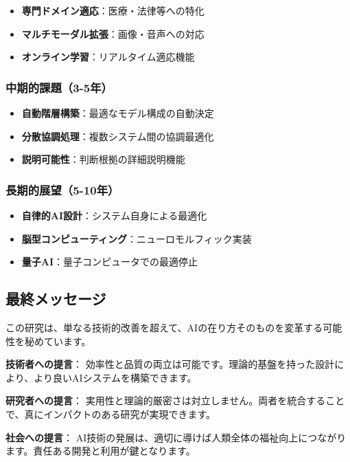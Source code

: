 \documentclass[a4paper,12pt]{jsarticle}
\begin{document}
\begin{itemize}
\item \textbf{専門ドメイン適応}：医療・法律等への特化
\item \textbf{マルチモーダル拡張}：画像・音声への対応
\item \textbf{オンライン学習}：リアルタイム適応機能
\end{itemize}

\subsubsection{中期的課題（3-5年）}

\begin{itemize}
\item \textbf{自動階層構築}：最適なモデル構成の自動決定
\item \textbf{分散協調処理}：複数システム間の協調最適化
\item \textbf{説明可能性}：判断根拠の詳細説明機能
\end{itemize}

\subsubsection{長期的展望（5-10年）}

\begin{itemize}
\item \textbf{自律的AI設計}：システム自身による最適化
\item \textbf{脳型コンピューティング}：ニューロモルフィック実装
\item \textbf{量子AI}：量子コンピュータでの最適停止
\end{itemize}

\subsection{最終メッセージ}

この研究は、単なる技術的改善を超えて、AIの在り方そのものを変革する可能性を秘めています。

\textbf{技術者への提言}：
効率性と品質の両立は可能です。理論的基盤を持った設計により、より良いAIシステムを構築できます。

\textbf{研究者への提言}：
実用性と理論的厳密さは対立しません。両者を統合することで、真にインパクトのある研究が実現できます。

\textbf{社会への提言}：
AI技術の発展は、適切に導けば人類全体の福祉向上につながります。責任ある開発と利用が鍵となります。
\end{document}
